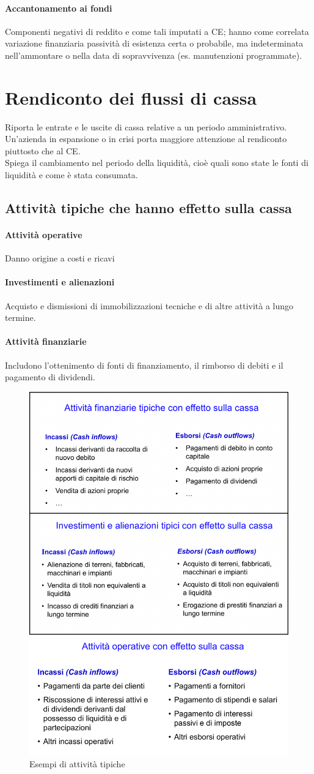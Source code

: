 \documentclass{report}
\begin{document}
	\paragraph{Accantonamento ai fondi} Componenti negativi di reddito e come tali imputati a CE; hanno come correlata variazione finanziaria passività di esistenza certa o probabile, ma indeterminata  nell'ammontare o nella data di sopravvivenza (es. manutenzioni programmate).
	\section{Rendiconto dei flussi di cassa}
	Riporta le entrate e le uscite di cassa relative a un periodo amministrativo. Un'azienda in espansione o in crisi porta maggiore attenzione al rendiconto piuttosto che al CE.
	\medskip \\Spiega il cambiamento nel periodo della liquidità, cioè quali sono state le fonti di liquidità e come è stata consumata.
	\subsection{Attività tipiche che hanno effetto sulla cassa}
	\paragraph{Attività operative} Danno origine a costi e ricavi
	\paragraph{Investimenti e alienazioni} Acquisto e dismissioni di immobilizzazioni tecniche e di altre attività a lungo termine.
	\paragraph{Attività finanziarie} Includono l'ottenimento di fonti di finanziamento, il rimborso di debiti e il pagamento di dividendi.
	\begin{figure}[H]
		\centering
		\includegraphics[width=0.55\linewidth]{image-2}
		\caption{Esempi di attività tipiche}
		\label{fig:image-2}
	\end{figure}
\end{document}
